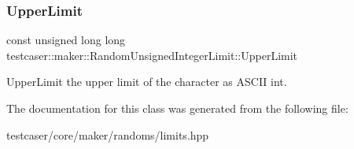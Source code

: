\subsubsection{\texorpdfstring{UpperLimit}{UpperLimit}}
{\footnotesize\ttfamily const unsigned long long testcaser\+::maker\+::\+Random\+Unsigned\+Integer\+Limit\+::\+Upper\+Limit}



Upper\+Limit the upper limit of the character as A\+S\+C\+II int. 



The documentation for this class was generated from the following file\+:\begin{DoxyCompactItemize}
\item 
testcaser/core/maker/randoms/limits.\+hpp\end{DoxyCompactItemize}
